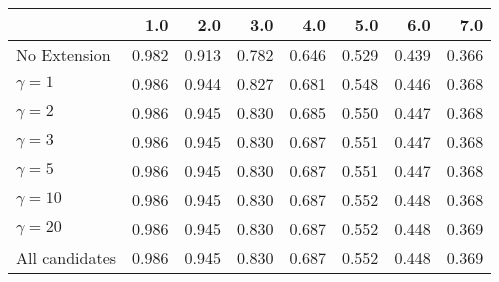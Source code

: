 \begin{tabular}{lrrrrrrr}
\toprule
{} &   1.0 &   2.0 &   3.0 &   4.0 &   5.0 &   6.0 &   7.0 \\
\midrule
No Extension   & 0.982 & 0.913 & 0.782 & 0.646 & 0.529 & 0.439 & 0.366 \\
$\gamma = 1$   & 0.986 & 0.944 & 0.827 & 0.681 & 0.548 & 0.446 & 0.368 \\
$\gamma = 2$   & 0.986 & 0.945 & 0.830 & 0.685 & 0.550 & 0.447 & 0.368 \\
$\gamma = 3$   & 0.986 & 0.945 & 0.830 & 0.687 & 0.551 & 0.447 & 0.368 \\
$\gamma = 5$   & 0.986 & 0.945 & 0.830 & 0.687 & 0.551 & 0.447 & 0.368 \\
$\gamma = 10$  & 0.986 & 0.945 & 0.830 & 0.687 & 0.552 & 0.448 & 0.368 \\
$\gamma = 20$  & 0.986 & 0.945 & 0.830 & 0.687 & 0.552 & 0.448 & 0.369 \\
All candidates & 0.986 & 0.945 & 0.830 & 0.687 & 0.552 & 0.448 & 0.369 \\
\bottomrule
\end{tabular}
